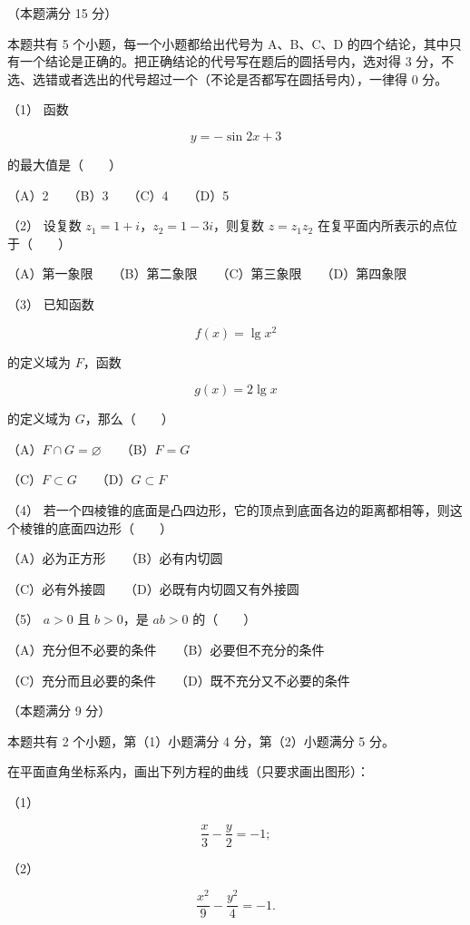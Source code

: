 \begin{question}
（本题满分 15 分）

本题共有 5 个小题，每一个小题都给出代号为 A、B、C、D 的四个结论，其中只有一个结论是正确的。把正确结论的代号写在题后的圆括号内，选对得 3 分，不选、选错或者选出的代号超过一个（不论是否都写在圆括号内），一律得 0 分。

（1） 函数

\nopagebreak[4]
\[
y=-\sin2x+3
\]

的最大值是\mbox{（　　）}

（A）2　　（B）3　　（C）4　　（D）5

（2） 设复数 $z_1=1+i$，$z_2=1-3i$，则复数
$z=z_1z_2$ 在复平面内所表示的点位于\mbox{（　　）}

（A）第一象限　　（B）第二象限　　（C）第三象限　　（D）第四象限

（3） 已知函数

\nopagebreak[4]
\[
f(x)=\lg x^2
\]

的定义域为 $F$，函数

\nopagebreak[4]
\[
g(x)=2\lg x
\]

的定义域为 $G$，那么\mbox{（　　）}

（A）$F\cap G=\varnothing$　　（B）$F=G$

（C）$F\subset G$　　（D）$G\subset F$

（4） 若一个四棱锥的底面是凸四边形，它的顶点到底面各边的距离都相等，则这个棱锥的底面四边形\mbox{（　　）}

（A）必为正方形　　（B）必有内切圆

（C）必有外接圆　　（D）必既有内切圆又有外接圆

（5） $a>0$ 且 $b>0$，是 $ab>0$ 的\mbox{（　　）}

（A）充分但不必要的条件　　（B）必要但不充分的条件

（C）充分而且必要的条件　　（D）既不充分又不必要的条件

\Needspace{0.4\textheight}
\end{question}
\begin{question}
（本题满分 9 分）

本题共有 2 个小题，第（1）小题满分 4 分，第（2）小题满分 5 分。

在平面直角坐标系内，画出下列方程的曲线（只要求画出图形）：

（1）　

\nopagebreak[4]
\[
\frac{x}{3}-\frac{y}{2}=-1;
\]

（2）　

\nopagebreak[4]
\[
\frac{x^2}{9}-\frac{y^2}{4}=-1.
\]
\nopagebreak[4]
\begin{center}\end{center}
\nopagebreak[4]
\end{question}
